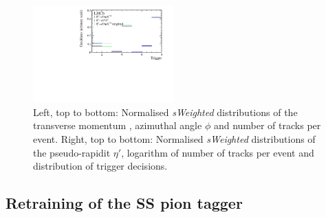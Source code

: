 \begin{figure}[tbp]
    \includegraphics[width=0.48\textwidth]{08FlavourTagging/figs/Trigger_weighted.pdf}
    \caption{Left, top to bottom: Normalised \emph{sWeighted} distributions of the transverse momentum \pt, azimuthal angle $\phi$ and number of tracks per event.
    Right, top to bottom: Normalised \emph{sWeighted} distributions of the pseudo-rapidit $\eta'$, logarithm of number of tracks per event and distribution of trigger decisions.}
    \label{fig:reweightingSS}
\end{figure}

\subsection{Retraining of the SS pion tagger}
\label{sec:retrainSSpion}

